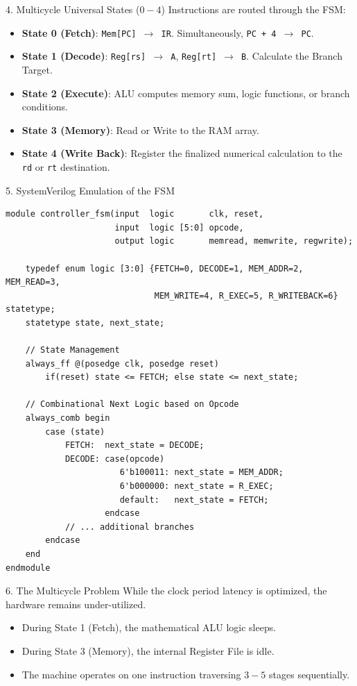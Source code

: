 \documentclass[aspectratio=169]{beamer}
\begin{document}
\begin{frame}{4. Multicycle Universal States ($0-4$)}
Instructions are routed through the FSM:
\begin{itemize}
    \item \textbf{State 0 (Fetch)}: \texttt{Mem[PC] $\to$ IR}. Simultaneously, \texttt{PC + 4 $\to$ PC}.
    \item \textbf{State 1 (Decode)}: \texttt{Reg[rs] $\to$ A}, \texttt{Reg[rt] $\to$ B}. Calculate the Branch Target.
    \item \textbf{State 2 (Execute)}: ALU computes memory sum, logic functions, or branch conditions.
    \item \textbf{State 3 (Memory)}: Read or Write to the RAM array.
    \item \textbf{State 4 (Write Back)}: Register the finalized numerical calculation to the \texttt{rd} or \texttt{rt} destination.
\end{itemize}
\end{frame}

\begin{frame}[fragile]{5. SystemVerilog Emulation of the FSM}
\begin{verbatim}
module controller_fsm(input  logic       clk, reset,
                      input  logic [5:0] opcode,
                      output logic       memread, memwrite, regwrite);
                      
    typedef enum logic [3:0] {FETCH=0, DECODE=1, MEM_ADDR=2, MEM_READ=3, 
                              MEM_WRITE=4, R_EXEC=5, R_WRITEBACK=6} statetype;
    statetype state, next_state;
    
    // State Management
    always_ff @(posedge clk, posedge reset) 
        if(reset) state <= FETCH; else state <= next_state;
        
    // Combinational Next Logic based on Opcode
    always_comb begin
        case (state)
            FETCH:  next_state = DECODE;
            DECODE: case(opcode)
                       6'b100011: next_state = MEM_ADDR;
                       6'b000000: next_state = R_EXEC;
                       default:   next_state = FETCH;
                    endcase
            // ... additional branches
        endcase
    end
endmodule
\end{verbatim}
\end{frame}

\begin{frame}{6. The Multicycle Problem}
While the clock period latency is optimized, the hardware remains under-utilized.
\vspace{0.2cm}
\begin{itemize}
    \item During State 1 (Fetch), the mathematical ALU logic sleeps.
    \item During State 3 (Memory), the internal Register File is idle.
    \item The machine operates on one instruction traversing $3-5$ stages sequentially.
\end{itemize}
\end{frame}
\end{document}
